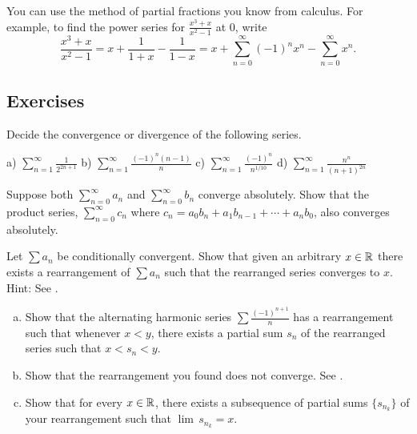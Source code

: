 You can use the method of partial fractions you know from calculus.
For example, to find the power series for $\frac{x^3+x}{x^2-1}$ at 0, write
\begin{equation*}
\frac{x^3+x}{x^2-1}
=
x + \frac{1}{1+x} - \frac{1}{1-x}
=
x + \sum_{n=0}^\infty {(-1)}^n x^n - \sum_{n=0}^\infty x^n .
\end{equation*}

\subsection{Exercises}

\begin{exercise}
Decide the convergence or divergence of the following series.

\medskip

\noindent
a)
$\displaystyle \sum_{n=1}^\infty \frac{1}{2^{2n+1}}$
\qquad
b)
$\displaystyle \sum_{n=1}^\infty \frac{{(-1)}^{n}(n-1)}{n}$
\qquad
c)
$\displaystyle \sum_{n=1}^\infty \frac{{(-1)}^n}{n^{1/10}}$
\qquad
d)
$\displaystyle \sum_{n=1}^\infty \frac{n^n}{{(n+1)}^{2n}}$
\end{exercise}

\begin{exercise}
Suppose both $\sum_{n=0}^\infty a_n$ and $\sum_{n=0}^\infty b_n$ 
converge absolutely.
Show that the product series, $\sum_{n=0}^\infty c_n$ where
$c_n = a_0 b_n + a_1 b_{n-1} + \cdots + a_n b_0$, also converges absolutely.
\end{exercise}

\begin{exercise}[Challenging] \label{exercise:seriesconvergestoanything}
Let $\sum a_n$ be conditionally convergent.
Show that given an arbitrary $x \in {\mathbb{R}}$
there exists a rearrangement of $\sum a_n$
such that the rearranged series converges to $x$.
Hint: See .
\end{exercise}

\begin{exercise}
\leavevmode
\begin{enumerate}[a)]
\item
Show that the alternating harmonic series $\sum
\frac{{(-1)}^{n+1}}{n}$ has a rearrangement
such that whenever $x < y$, there exists a partial sum $s_n$
of the rearranged series such that $x < s_n < y$.
\item
Show that the rearrangement you found does not converge.
See .
\item
Show that for every $x \in {\mathbb{R}}$, there exists a subsequence of
partial sums $\{ s_{n_k} \}$ of your rearrangement such that 
$\lim \, s_{n_k} = x$.
\end{enumerate}
\end{exercise}

